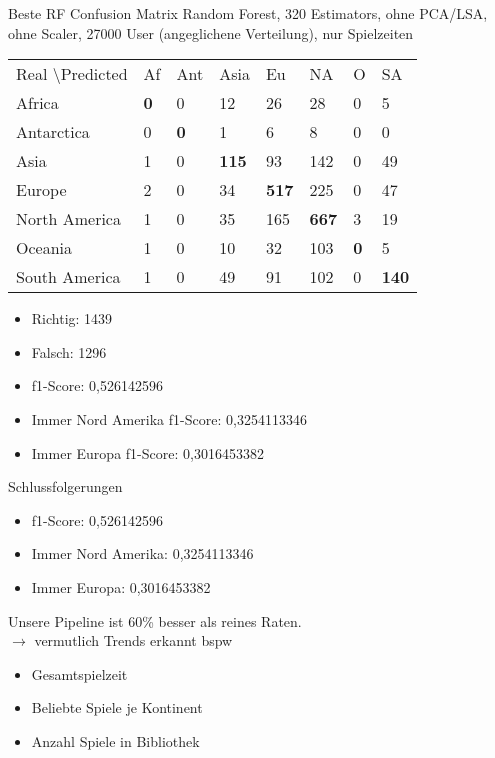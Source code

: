 \documentclass[12pt]{beamer}
\begin{document}
\begin{frame}[fragile]{Beste RF Confusion Matrix}
Random Forest, 320 Estimators, ohne PCA/LSA, ohne Scaler, 27000 User (angeglichene Verteilung), nur Spielzeiten \\
\medskip
\begin{tabular}{| l| l| l| l| l| l| l| l|}
\hline
Real \textbackslash Predicted & Af & Ant & Asia & Eu & NA & O & SA \\
Africa & \textbf{0} & 0 & 12 & 26 & 28 & 0 & 5 \\
Antarctica & 0 & \textbf{0} & 1 & 6 & 8 & 0 & 0 \\
Asia & 1 & 0 & \textbf{115} & 93 & 142 & 0 & 49 \\
Europe & 2 & 0 & 34 & \textbf{517} & 225 & 0 & 47 \\
North America & 1 & 0 & 35 & 165 & \textbf{667} & 3 & 19 \\
Oceania & 1 & 0 & 10 & 32 & 103 & \textbf{0} & 5 \\
South America & 1 & 0 & 49 & 91 & 102 & 0 & \textbf{140} \\
\hline
\end{tabular}
\begin{itemize}
\item Richtig: 1439
\item Falsch: 1296
\item f1-Score: 0,526142596
\item Immer Nord Amerika f1-Score: 0,3254113346
\item Immer Europa f1-Score: 0,3016453382
\end{itemize}
\end{frame}

\begin{frame}[fragile]{Schlussfolgerungen}
\begin{itemize}
\item f1-Score: 0,526142596
\item Immer Nord Amerika: 0,3254113346
\item Immer Europa: 0,3016453382
\end{itemize}
Unsere Pipeline ist 60\% besser als reines Raten. \\
$ \rightarrow $ vermutlich Trends erkannt bspw
\begin{itemize}
\item Gesamtspielzeit
\item Beliebte Spiele je Kontinent
\item Anzahl Spiele in Bibliothek
\end{itemize}  

\end{frame}
\end{document}
